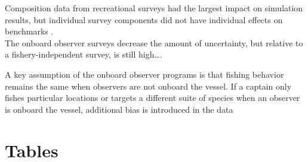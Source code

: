 \documentclass[
  authoryear,
  preprint,
  3p]{elsarticle}
\begin{document}
Composition data from recreational surveys had the largest impact on
simulation results, but individual survey components did not have
individual effects on benchmarks \citep{Siegfried:2016:ISA}.\\
The onboard observer surveys decrease the amount of uncertainty, but
relative to a fishery-independent survey, is still high\ldots.

A key assumption of the onboard observer programs is that fishing
behavior remains the same when observers are not onboard the vessel. If
a captain only fishes particular locations or targets a different suite
of species when an observer is onboard the vessel, additional bias is
introduced in the data

\FloatBarrier

\hypertarget{tables}{%
\section{Tables}\label{tables}}
\end{document}
